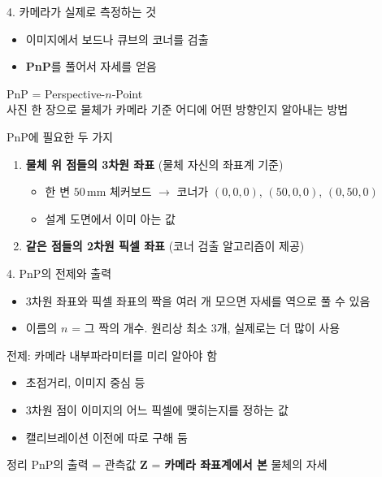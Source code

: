 \documentclass[aspectratio=169,11pt]{beamer}
\begin{document}
\begin{frame}{4. 카메라가 실제로 측정하는 것}
  \begin{itemize}
    \item 이미지에서 보드나 큐브의 코너를 검출
    \item \textbf{PnP}를 풀어서 자세를 얻음
  \end{itemize}
  \vfill
  PnP = Perspective-$n$-Point\\
  사진 한 장으로 물체가 카메라 기준 어디에 어떤 방향인지 알아내는 방법
  \vfill
  \begin{block}{PnP에 필요한 두 가지}
    \begin{enumerate}
      \item \textbf{물체 위 점들의 3차원 좌표} (물체 자신의 좌표계 기준)
        \begin{itemize}
          \item 한 변 $50\,\mathrm{mm}$ 체커보드 $\rightarrow$
            코너가 $(0,0,0)$, $(50,0,0)$, $(0,50,0)$
          \item 설계 도면에서 이미 아는 값
        \end{itemize}
      \item \textbf{같은 점들의 2차원 픽셀 좌표} (코너 검출 알고리즘이 제공)
    \end{enumerate}
  \end{block}
\end{frame}

\begin{frame}{4. PnP의 전제와 출력}
  \begin{itemize}
    \item 3차원 좌표와 픽셀 좌표의 짝을 여러 개 모으면 자세를 역으로 풀 수 있음
    \item 이름의 $n$ = 그 짝의 개수. 원리상 최소 $3$개, 실제로는 더 많이 사용
  \end{itemize}
  \vfill
  \begin{block}{전제: 카메라 내부파라미터를 미리 알아야 함}
    \begin{itemize}
      \item 초점거리, 이미지 중심 등
      \item 3차원 점이 이미지의 어느 픽셀에 맺히는지를 정하는 값
      \item 캘리브레이션 이전에 따로 구해 둠
    \end{itemize}
  \end{block}
  \vfill
  \begin{alertblock}{정리}
    PnP의 출력 = 관측값 $\mathbf{Z}$ = \textbf{카메라 좌표계에서 본} 물체의 자세
  \end{alertblock}
\end{frame}
\end{document}
